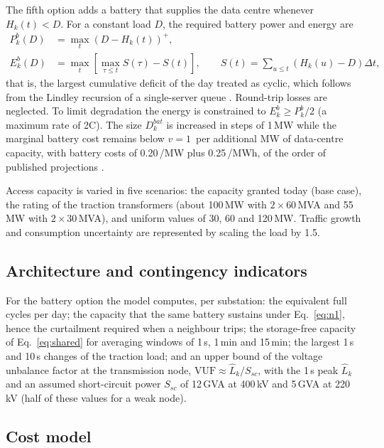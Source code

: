 The fifth option adds a battery that supplies the data centre whenever $H_k(t)<D$. For a constant load $D$, the required battery power and energy are
\begin{align}
P^{b}_k(D) &= \max_t\left(D - H_k(t)\right)^+, \label{eq:pb}\\
E^{b}_k(D) &= \max_t\left[\max_{\tau\le t} S(\tau) - S(t)\right],\qquad S(t)=\sum_{u\le t}\left(H_k(u)-D\right)\Delta t, \label{eq:eb}
\end{align}
that is, the largest cumulative deficit of the day treated as cyclic, which follows from the Lindley recursion of a single-server queue \cite{lindley1952}. Round-trip losses are neglected. To limit degradation the energy is constrained to $E^b_k \ge P^b_k/2$ (a maximum rate of 2C). The size $D^{bat}_k$ is increased in steps of 1\,MW while the marginal battery cost remains below $v=1$\,\MEUR{} per additional MW of data-centre capacity, with battery costs of 0.20\,\MEUR/MW plus 0.25\,\MEUR/MWh, of the order of published projections \cite{schmidt2019}.

Access capacity is varied in five scenarios: the capacity granted today (base case), the rating of the traction transformers (about 100\,MW with $2\times60$\,MVA and 55\,MW with $2\times30$\,MVA), and uniform values of 30, 60 and 120\,MW. Traffic growth and consumption uncertainty are represented by scaling the load by 1.5.

\subsection{Architecture and contingency indicators}

For the battery option the model computes, per substation: the equivalent full cycles per day; the capacity that the same battery sustains under Eq.~\eqref{eq:n1}, hence the curtailment required when a neighbour trips; the storage-free capacity of Eq.~\eqref{eq:shared} for averaging windows of 1\,s, 1\,min and 15\,min; the largest 1\,s and 10\,s changes of the traction load; and an upper bound of the voltage unbalance factor at the transmission node, $\mathrm{VUF}\approx \hat{L}_k/S_{sc}$, with the 1\,s peak $\hat{L}_k$ and an assumed short-circuit power $S_{sc}$ of 12\,GVA at 400\,kV and 5\,GVA at 220\,kV (half of these values for a weak node).

\subsection{Cost model}

